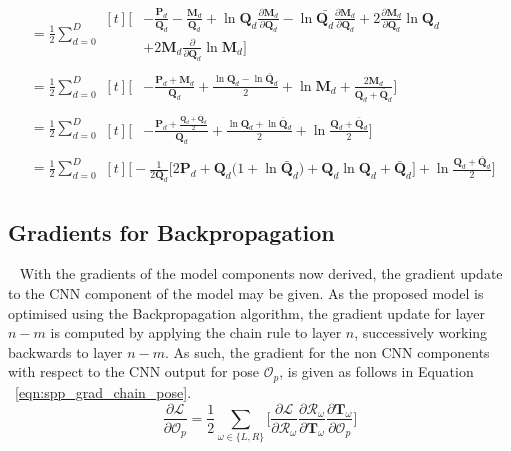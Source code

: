 \begin{align}
  {}&= \frac{1}{2} \sum_{d = 0}^{D}
  \begin{aligned}[t]
    \Bigg[ {}&
      -\frac{\bm{P}_{d}}{\bm{Q}_{d}}
      -\frac{\bm{M}_{d}}{\bm{Q}_{d}}
      +\ln{\bm{Q}_{d}} \frac{\partial \bm{M}_{d}}{\partial \bm{Q}_{d}}
      -\ln{\bar{\bm{Q}_{d}}} \frac{\partial \bm{M}_{d}}{\partial \bm{Q}_{d}}
      +2 \frac{\partial \bm{M}_{d}}{\partial \bm{Q}_{d}} \ln{\bm{Q}_{d}}\\
      {}&
      +2 \bm{M}_{d} \frac{\partial}{\partial \bm{Q}_{d}} \ln{\bm{M}_{d}}
    \Bigg]
  \end{aligned}\\
  {}&= \frac{1}{2} \sum_{d = 0}^{D}
  \begin{aligned}[t]
    \Bigg[ {}&
      -\frac{\bm{P}_{d} + \bm{M}_{d}}{\bm{Q}_{d}}
      +\frac{\ln{\bm{Q}_{d} - \ln{\bar{\bm{Q}}_{d}}}}{2}
      +\ln{\bm{M}_{d}} 
      +\frac{2\bm{M}_{d}}{\bm{Q}_{d} + \bar{\bm{Q}}_{d}}
    \Bigg]
  \end{aligned}\\
  {}&= \frac{1}{2} \sum_{d = 0}^{D}
  \begin{aligned}[t]
    \Bigg[ {}&
      -\frac{\bm{P}_{d} + \frac{\bm{Q}_{d} + \bar{\bm{Q}}_{d}}{2}}{\bm{Q}_{d}}
      +\frac{\ln{\bm{Q}_{d}} + \ln{\bar{\bm{Q}}_{d}}}{2}
      +\ln{\frac{\bm{Q}_{d} + \bar{\bm{Q}}_{d}}{2}}
    \Bigg]
  \end{aligned}\\
  {}&= \frac{1}{2} \sum_{d = 0}^{D}
  \begin{aligned}[t]
    \Bigg [
      -\frac{1}{2 \bm{Q}_{d}} \Bigg[
        2 \bm{P}_{d} + \bm{Q}_{d} \big( 1 + \ln{\bar{\bm{Q}}_{d}} \big)
        + \bm{Q}_{d} \ln{\bm{Q}_{d}}
        + \bar{\bm{Q}}_{d}
      \Bigg]
      +\ln{\frac{\bm{Q}_{d} + \bar{\bm{Q}}_{d}}{2}}
    \Bigg]
  \end{aligned}
\end{align}

\subsection{Gradients for Backpropagation}
~\label{subsec:spp_backprop}
With the gradients of the model components now derived, the gradient update to the CNN component 
of the model may be given. As the proposed model is optimised using the Backpropagation algorithm, 
the gradient update for layer \( n - m \) is computed by applying the chain rule to layer \( n \), 
successively working backwards to layer \( n - m \). As such, the gradient for the non CNN components 
with respect to the CNN output for pose \( \mathcal{O}_{p} \), is given as follows in Equation
~\ref{eqn:spp_grad_chain_pose}.
\begin{equation}
  \label{eqn:spp_grad_chain_pose}
  \frac{\partial \mathcal{L}}{\partial \mathcal{O}_{p}} = 
  \frac{1}{2} \sum_{\omega \in \{L, R\}} \Bigg[
    \frac{\partial \mathcal{L}}{\partial \mathcal{R}_{\omega}}
    \frac{\partial \mathcal{R}_{\omega}}{\partial \bm{T}_{\omega}}
    \frac{\partial \bm{T}_{\omega}}{\partial \mathcal{O}_{p}}
  \Bigg]
\end{equation}

